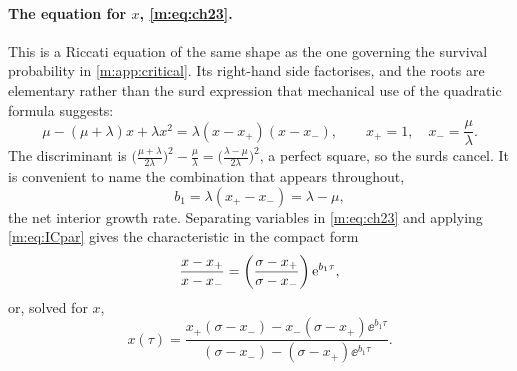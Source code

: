 \paragraph{The equation for $x$, \eqref{m:eq:ch23}.}
This is a Riccati equation of the same shape as the one governing the survival
probability in \cref{m:app:critical}. Its right-hand side factorises, and the
roots are elementary rather than the surd expression that mechanical use of the
quadratic formula suggests:
\begin{equation}
\label{m:eq:xpm}
\mu-(\mu+\lambda)x+\lambda x^2 = \lambda(x-x_+)(x-x_-),
\qquad
x_+ = 1,\quad x_- = \frac{\mu}{\lambda} .
\end{equation}
The discriminant is
$\bigl(\tfrac{\mu+\lambda}{2\lambda}\bigr)^2 - \tfrac{\mu}{\lambda}
= \bigl(\tfrac{\lambda-\mu}{2\lambda}\bigr)^2$, a perfect square, so the surds
cancel. It is convenient to name the combination that appears throughout,
\begin{equation}
\label{m:eq:b1}
b_1 = \lambda(x_+-x_-) = \lambda-\mu ,
\end{equation}
the net interior growth rate. Separating variables in \cref{m:eq:ch23} and
applying \cref{m:eq:ICpar} gives the characteristic in the compact form
\begin{equation}
\label{m:eq:xratio}
\frac{x-x_+}{x-x_-} = \left(\frac{\sigma-x_+}{\sigma-x_-}\right)\mathrm{e}^{b_1\tau},
\end{equation}
or, solved for $x$,
\begin{equation}
\label{m:eq:xabd}
x(\tau) = \frac{x_+(\sigma-x_-) - x_-(\sigma-x_+)\ee^{b_1\tau}}
{(\sigma-x_-) - (\sigma-x_+)\ee^{b_1\tau}} .
\end{equation}


